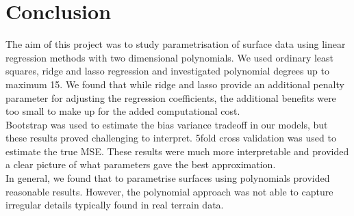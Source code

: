 \documentclass[notitlepage, reprint, nofootinbib]{revtex4-1}
\begin{document}
\section{Conclusion}
The aim of this project was to study parametrisation of surface data using linear regression methods with two dimensional polynomials. We used ordinary least squares, ridge and lasso regression and investigated polynomial degrees up to maximum 15. We found that while ridge and lasso provide an additional penalty parameter for adjusting the regression coefficients, the additional benefits were too small to make up for the added computational cost. \\[2mm]
Bootstrap was used to estimate the bias variance tradeoff in our models, but these results proved challenging to interpret. 5fold cross validation was used to estimate the true MSE. These results were much more interpretable and provided a clear picture of what parameters gave the best approximation. \\[2mm]
In general, we found that to parametrise surfaces using polynomials provided reasonable results. However, the polynomial approach was not able to capture irregular details typically found in real terrain data. 



\end{document}
